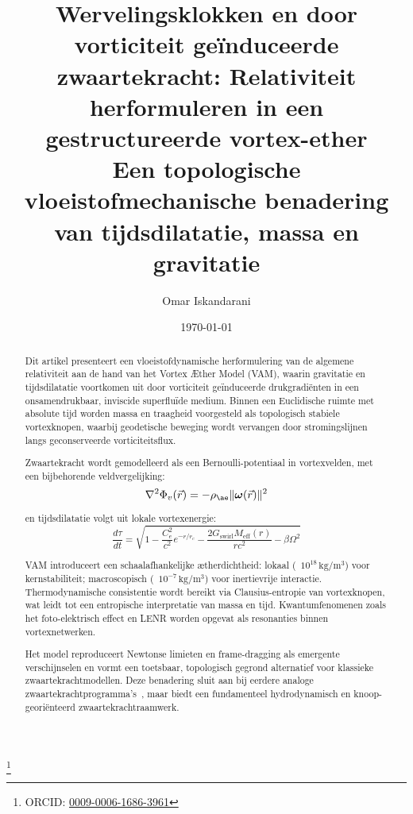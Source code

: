 \documentclass[a4paper, aps,preprint,superscriptaddress, 12pt]{revtex4}
\begin{document}
\author{Omar Iskandarani}
\title{
    Wervelingsklokken en door vorticiteit geïnduceerde zwaartekracht:
    Relativiteit herformuleren in een gestructureerde vortex-ether\\
        \textnormal{\normalsize Een topologische vloeistofmechanische benadering van tijdsdilatatie, massa en gravitatie}
}

\date{\today}
\thanks{ORCID: \href{https://orcid.org/0009-0006-1686-3961}{0009-0006-1686-3961}}



\begin{abstract}
Dit artikel presenteert een vloeistofdynamische herformulering van de algemene relativiteit aan de hand van het Vortex Æther Model (VAM), waarin gravitatie en tijdsdilatatie voortkomen uit door vorticiteit geïnduceerde drukgradiënten in een onsamendrukbaar, inviscide superfluïde medium. Binnen een Euclidische ruimte met absolute tijd worden massa en traagheid voorgesteld als topologisch stabiele vortexknopen, waarbij geodetische beweging wordt vervangen door stromingslijnen langs geconserveerde vorticiteitsflux.

Zwaartekracht wordt gemodelleerd als een Bernoulli-potentiaal in vortexvelden, met een bijbehorende veldvergelijking:
\begin{equation*}
    \nabla^2 \Phi_v(\vec{r}) = -\rho_{\ae} \|\boldsymbol{\omega}(\vec{r})\|^2
\end{equation*}


en tijdsdilatatie volgt uit lokale vortexenergie:
\begin{equation*}
    \frac{d\tau}{dt} = \sqrt{1 - \frac{C_e^2}{c^2} e^{-r/r_c} - \frac{2G_{\text{swirl}} M_{\text{eff}}(r)}{rc^2} - \beta \Omega^2}
\end{equation*}

VAM introduceert een schaalafhankelijke ætherdichtheid: lokaal (~$10^{18}\,\mathrm{kg/m^3}$) voor kernstabiliteit; macroscopisch (~$10^{-7}\,\mathrm{kg/m^3}$) voor inertievrije interactie. Thermodynamische consistentie wordt bereikt via Clausius-entropie van vortexknopen, wat leidt tot een entropische interpretatie van massa en tijd. Kwantumfenomenen zoals het foto-elektrisch effect en LENR worden opgevat als resonanties binnen vortexnetwerken.

Het model reproduceert Newtonse limieten en frame-dragging als emergente verschijnselen en vormt een toetsbaar, topologisch gegrond alternatief voor klassieke zwaartekrachtmodellen. Deze benadering sluit aan bij eerdere analoge zwaartekrachtprogramma’s~\cite{barcelo2011analogue,volovik2009universe}, maar biedt een fundamenteel hydrodynamisch en knoop-georiënteerd zwaartekrachtraamwerk.
\end{abstract}
\end{document}
